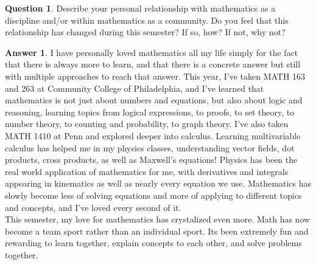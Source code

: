 \documentclass[article, 12pt]{article}
\theoremstyle{definition}
\newtheorem{question}{Question}
\newtheorem{answer}{Answer}
\begin{document}
    \begin{question}
        Describe your personal relationship with mathematics as a discipline and/or within mathematics as a community. Do you feel that this relationship has changed during this semester? If so, how? If not, why not?
    \end{question}
    \begin{answer}
        I have personally loved mathematics all my life simply for the fact that there is always more to learn, and that there is a concrete answer but still with multiple approaches to reach that answer. This year, I've taken MATH 163 and 263 at Community College of Philadelphia, and I've learned that mathematics is not just about numbers and equations, but also about logic and reasoning, learning topics from logical expressions, to proofs, to set theory, to number theory, to counting and probability, to graph theory. I've also taken MATH 1410 at Penn and explored deeper into calculus. Learning multivariable calculus has helped me in my physics classes, understanding vector fields, dot products, cross products, as well as Maxwell's equations! Physics has been the real world application of mathematics for me, with derivatives and integrals appearing in kinematics as well as nearly every equation we use. Mathematics has slowly become less of solving equations and more of applying to different topics and concepts, and I've loved every second of it.
        \\[12pt]
        This semester, my love for mathematics has crystalized even more. Math has now become a team sport rather than an individual sport. Its been extremely fun and rewarding to learn together, explain concepts to each other, and solve problems together. 
    \end{answer}
\end{document}
